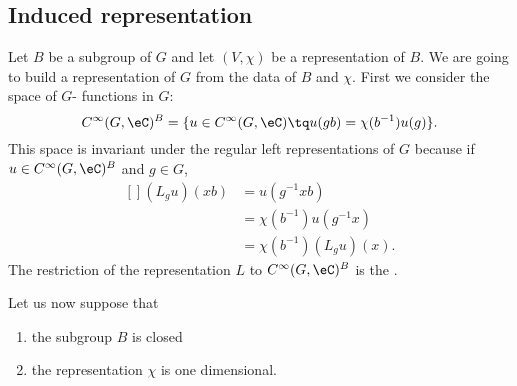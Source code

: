 \subsection{Induced representation}
\label{SubSecInducrepresBBGC}

Let $B$ be a subgroup of $G$ and let $(V,\chi)$ be a representation of $B$. We are going to build a representation of $G$ from the data of $B$ and $\chi$. First we consider the space of $G$- functions in $G$:
\begin{equation}
	C^{\infty}(G,\eC)^B=\{ u\in C^{\infty}(G,\eC)\tq u(gb)=\chi(b^{-1})u(g) \}.
\end{equation}
This space is invariant under the regular left representations of $G$ because if $u\in C^{\infty}(G,\eC)^B$ and $g\in G$,
\begin{equation}
	\begin{aligned}[]
		(L_gu)(xb)&=u(g^{-1}xb)\\
		&=\chi(b^{-1})u(g^{-1}x)\\
		&=\chi(b^{-1})(L_gu)(x).
	\end{aligned}
\end{equation}
The restriction of the representation $L$ to $C^{\infty}(G,\eC)^B$ is the .

Let us now suppose that
\begin{enumerate}

	\item
		the subgroup $B$ is closed
	\item
		the representation $\chi$ is one dimensional.
\end{enumerate}

